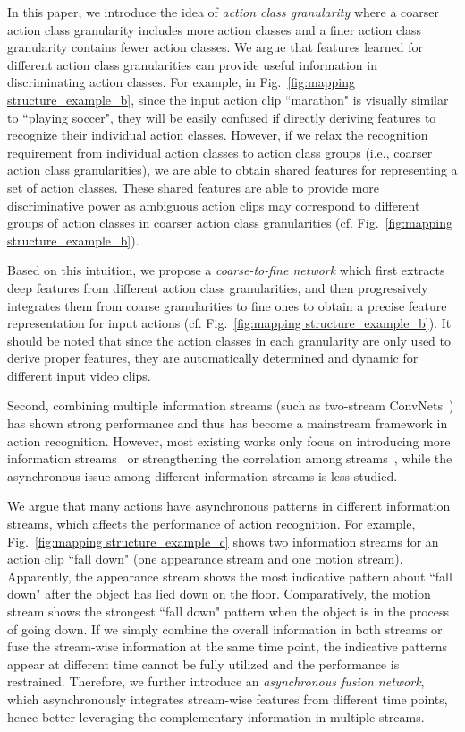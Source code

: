 \documentclass[letterpaper]{article} %
\begin{document}
In this paper, we introduce the idea of \emph{action class granularity} where a coarser action class granularity includes more action classes and a finer action class granularity contains fewer action classes. We argue that features learned for different action class  granularities can provide useful information in discriminating action classes. For example, in Fig.~\ref{fig:mapping structure_example_b}, since the input action clip ``marathon" is visually similar to ``playing soccer", they will be easily confused if directly deriving features to recognize their individual action classes. However, if we relax the recognition requirement from individual action classes to action class groups (i.e., coarser action class granularities), we are able to obtain shared features for representing a set of action classes. These shared features are able to provide more discriminative power as ambiguous action clips may correspond to different groups of action classes in coarser action class granularities (cf. Fig.~\ref{fig:mapping structure_example_b}).

Based on this intuition, we propose a \emph{coarse-to-fine network} which first extracts deep features from different action class granularities, and then progressively integrates them from coarse granularities to fine ones to obtain a precise feature representation for input actions (cf. Fig.~\ref{fig:mapping structure_example_b}). It should be noted that since the action classes in each granularity are only used to derive proper features, they are automatically determined and dynamic for different input video clips.



Second, combining multiple information streams (such as two-stream ConvNets~\cite{baseline}) has shown strong performance and thus has become a mainstream framework in action recognition. However, most existing works only focus on introducing more information streams~\cite{3stream,3stream2} or strengthening the correlation among streams~\cite{TSN,wumultifusion,lstmiccv2017}, while the asynchronous issue among different information streams is less studied.

We argue that many actions have asynchronous patterns in different information streams, which affects the performance of action recognition. For example, Fig.~\ref{fig:mapping structure_example_c} shows two information streams for an action clip ``fall down" (one appearance stream and one motion stream). Apparently, the appearance stream shows the most indicative pattern about ``fall down" after the object has lied down on the floor. Comparatively, the motion stream shows the strongest ``fall down" pattern when the object is in the process of going down. If we simply combine the overall information in both streams or fuse the stream-wise information at the same time point, the indicative patterns appear at different time cannot be fully utilized and the performance is restrained. Therefore, we further introduce an \emph{asynchronous fusion network}, which asynchronously integrates stream-wise features from different time points, hence better leveraging the complementary information in multiple streams.
\end{document}
